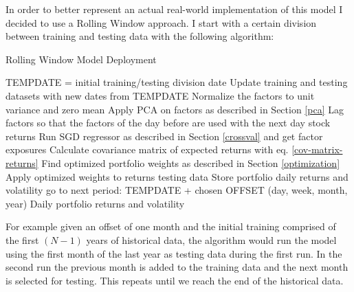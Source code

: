 In order to better represent an actual real-world implementation of this model I decided to use a Rolling Window approach. I start with a certain division between training and testing data with the following algorithm:
\begin{algorithm}
	\caption{Rolling Window Model Deployment}
	\begin{algorithmic}[1]
		\STATE TEMPDATE = initial training/testing division date
		\STATE Update training and testing datasets with new dates from TEMPDATE
		\STATE Normalize the factors to unit variance and zero mean
		\STATE Apply PCA on factors as described in Section \ref{pca}
		\STATE Lag factors so that the factors of the day before are used with the next day stock returns
		\STATE Run SGD regressor as described in Section \ref{crossval} and get factor exposures
		\STATE Calculate covariance matrix of expected returns with eq. \eqref{cov-matrix-returns}
		\STATE Find optimized portfolio weights as described in Section \ref{optimization}
		\STATE Apply optimized weights to returns testing data
		\STATE Store portfolio daily returns and volatility
		\STATE go to next period: TEMPDATE + chosen OFFSET (day, week, month, year)
		\ENDWHILE
		\RETURN Daily portfolio returns and volatility
	\end{algorithmic}
\end{algorithm}


For example given an offset of one month and the initial training comprised of the first $(N - 1)$ years of historical data, the algorithm would run the model using the first month of the last year as testing data during the first run. In the second run the previous month is added to the training data and the next month is selected for testing. This repeats until we reach the end of the historical data.